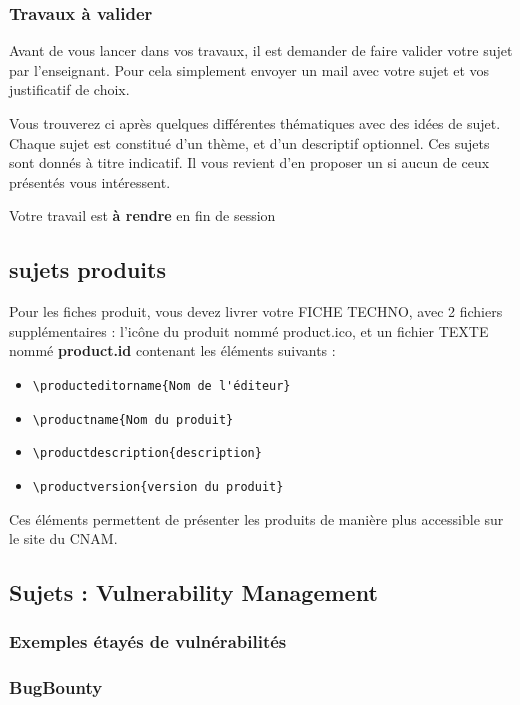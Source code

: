 \begin{frame}
\frametitle<presentation>{Travaux à valider}
Avant de vous lancer dans vos travaux, il est demander de faire valider votre sujet par l'enseignant. Pour cela simplement envoyer un mail avec votre sujet et vos justificatif de choix.

Vous trouverez ci après quelques différentes thématiques avec des idées de sujet. Chaque sujet est constitué d'un thème, et d'un descriptif optionnel.
Ces sujets sont donnés à titre indicatif. Il vous revient d'en proposer un si aucun de ceux présentés vous intéressent.

Votre travail est \textbf{à rendre} en fin de session

\end{frame}


\subsection{ sujets produits}

Pour les fiches produit,  vous devez livrer votre FICHE TECHNO, avec 2 fichiers supplémentaires : l'icône du produit nommé product.ico, et un fichier TEXTE nommé \textbf{product.id} contenant les éléments suivants :

\begin{itemize}
  \item  \verb|\producteditorname{Nom de l'éditeur}|
  \item   \verb|\productname{Nom du produit}|
  \item  \verb|\productdescription{description}|
  \item   \verb|\productversion{version du produit}|
\end{itemize}

Ces éléments permettent de présenter les produits de manière plus accessible sur le site du CNAM.

\subsection{Sujets : Vulnerability Management}
\subsubsection{Exemples étayés de vulnérabilités}
\subsubsection{BugBounty}
